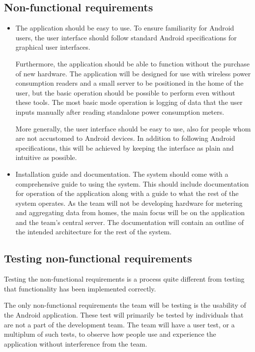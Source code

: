 \subsection{Non-functional requirements}

\begin{itemize}
\item The application should be easy to use.
To ensure familiarity for Android users, the user interface should follow standard Android specifications for graphical user interfaces.
 
Furthermore, the application should be able to function without the purchase of new hardware. The application will be designed for use with wireless power consumption readers and a small server to be positioned in the home of the user, but the basic operation should be possible to perform even without these tools. The most basic mode operation is logging of data that 
the user inputs manually after reading standalone power consumption meters.
 
More generally, the user interface should be easy to use, also for people whom are not accustomed to Android devices. In 
addition to following Android specifications, this will be achieved by keeping the interface as plain and intuitive as possible.
\end{itemize}

\begin{itemize}
\item Installation guide and documentation.
The system should come with a comprehensive guide to using the system. This should include documentation for operation of the
application along with a guide to what the rest of the system operates. As the team will not be developing hardware for metering and 
aggregating data from homes, the main focus will be on the application and the team's central server. The documentation will contain an outline 
of the intended architecture for the rest of the system.
\end{itemize}

\subsection{Testing non-functional requirements}
Testing the non-functional requirements is a process quite different from testing that functionality has been implemented correctly.

The only non-functional requirements the team will be testing is the usability of the Android application. These test will primarily be 
tested by individuals that are not a part of the development team. The team will have a user test, or a multiplum of such tests, to observe how people use and experience the application without interference from the team. 

